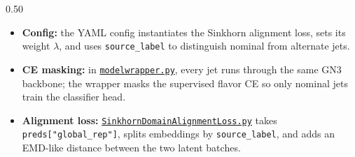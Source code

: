 \begin{frame}[plain]

  \vspace{6mm}
  \begin{columns}[T,totalwidth=0.96\textwidth]
    \begin{column}{0.50\textwidth}
      \raggedright
      {\small
      \begin{itemize}\tightlist
        \item \textbf{Config:} the YAML config instantiates the Sinkhorn alignment loss, sets its weight $\lambda$, and uses \texttt{source\_label} to distinguish nominal from alternate jets.
        \item \textbf{CE masking:} in \href{https://gitlab.cern.ch/lvaughan/salt/-/commit/1a56805558753deac3f03e123913c9c708f3dfe9}{\texttt{modelwrapper.py}}, every jet runs through the same GN3 backbone; the wrapper masks the supervised flavor CE so only nominal jets train the classifier head.
        \item \textbf{Alignment loss:} \href{https://gitlab.cern.ch/lvaughan/salt/-/commit/18b40f4233d9161f3e33831bc5cb4c53c322fdeb}{\texttt{SinkhornDomainAlignmentLoss.py}} takes \texttt{preds["global\_rep"]}, splits embeddings by \texttt{source\_label}, and adds an EMD-like distance between the two latent batches.
      \end{itemize}}


\end{column}
\end{columns}
\end{frame}
